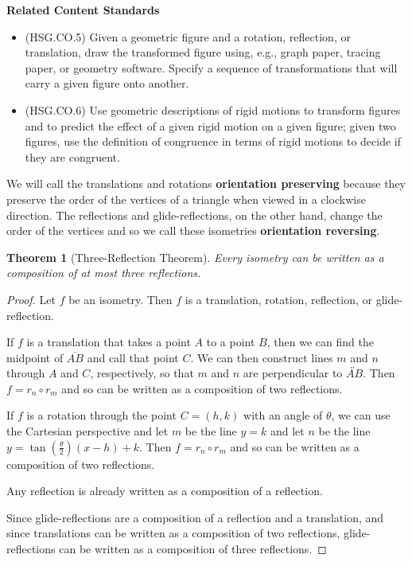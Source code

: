 \documentclass[
]{book}
\providecommand{\tightlist}{%
  \setlength{\itemsep}{0pt}\setlength{\parskip}{0pt}}
\newenvironment{standards}{}{}
\newtheorem{theorem}{Theorem}[chapter]
\theoremstyle{definition}
\theoremstyle{definition}
\theoremstyle{definition}
\theoremstyle{definition}
\theoremstyle{remark}
\begin{document}
\begin{standards}

\begin{center}
\textbf{Related Content Standards}

\end{center}

\begin{itemize}
\tightlist
\item
  (HSG.CO.5) Given a geometric figure and a rotation, reflection, or translation, draw the transformed figure using, e.g., graph paper, tracing paper, or geometry software. Specify a sequence of transformations that will carry a given figure onto another.
\item
  (HSG.CO.6) Use geometric descriptions of rigid motions to transform figures and to predict the effect of a given rigid motion on a given figure; given two figures, use the definition of congruence in terms of rigid motions to decide if they are congruent.
\end{itemize}

\end{standards}

We will call the translations and rotations \textbf{orientation preserving} because they preserve the order of the vertices of a triangle when viewed in a clockwise direction. The reflections and glide-reflections, on the other hand, change the order of the vertices and so we call these isometries \textbf{orientation reversing}.

\begin{theorem}[Three-Reflection Theorem]
Every isometry can be written as a composition of at most three reflections.
\end{theorem}

\begin{proof}
Let \(f\) be an isometry. Then \(f\) is a translation, rotation, reflection, or glide-reflection.

If \(f\) is a translation that takes a point \(A\) to a point \(B\), then we can find the midpoint of \(\overline{AB}\) and call that point \(C\). We can then construct lines \(m\) and \(n\) through \(A\) and \(C\), respectively, so that \(m\) and \(n\) are perpendicular to \(\overleftrightarrow{AB}\). Then \(f=r_n \circ r_m\) and so can be written as a composition of two reflections.

If \(f\) is a rotation through the point \(C=(h,k)\) with an angle of \(\theta\), we can use the Cartesian perspective and let \(m\) be the line \(y=k\) and let \(n\) be the line \(y= \tan\left( \frac{\theta}{2}\right) (x-h) +k\). Then \(f= r_n \circ r_m\) and so can be written as a composition of two reflections.

Any reflection is already written as a composition of a reflection.

Since glide-reflections are a composition of a reflection and a translation, and since translations can be written as a composition of two reflections, glide-reflections can be written as a composition of three reflections.
\end{proof}
\end{document}
